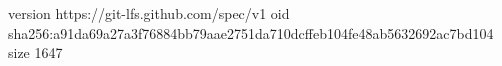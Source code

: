 version https://git-lfs.github.com/spec/v1
oid sha256:a91da69a27a3f76884bb79aae2751da710dcffeb104fe48ab5632692ac7bd104
size 1647
